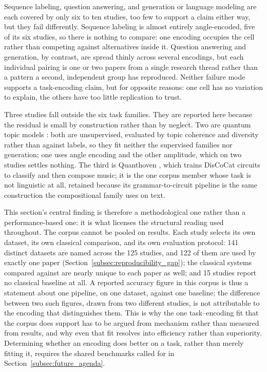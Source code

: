 \documentclass{ieeeaccess}
\begin{document}
Sequence labeling, question answering, and generation or language modeling are each covered by only six to ten studies, too few to support a claim either way, but they fail differently. Sequence labeling is almost entirely angle-encoded, five of its six studies, so there is nothing to compare: one encoding occupies the cell rather than competing against alternatives inside it. Question answering and generation, by contrast, are spread thinly across several encodings, but each individual pairing is one or two papers from a single research thread rather than a pattern a second, independent group has reproduced. Neither failure mode supports a task-encoding claim, but for opposite reasons: one cell has no variation to explain, the others have too little replication to trust.

Three studies fall outside the six task families. They are reported here because the residual is small by construction rather than by neglect. Two are quantum topic models \cite{kabir_qtopic_2026,qiao_quantum_2024}: both are unsupervised, evaluated by topic coherence and diversity rather than against labels, so they fit neither the supervised families nor generation; one uses angle encoding and the other amplitude, which on two studies settles nothing. The third is Quanthoven \cite{miranda_quantum_2022}, which trains DisCoCat circuits to classify and then compose music; it is the one corpus member whose task is not linguistic at all, retained because its grammar-to-circuit pipeline is the same construction the compositional family uses on text.

This section's central finding is therefore a methodological one rather than a performance-based one: it is what licenses the structural reading used throughout. The corpus cannot be pooled on results. Each study selects its own dataset, its own classical comparison, and its own evaluation protocol: 141 distinct datasets are named across the 125 studies, and 122 of them are used by exactly one paper (Section~\ref{subsec:reproducibility_gap}); the classical systems compared against are nearly unique to each paper as well; and 15 studies report no classical baseline at all. A reported accuracy figure in this corpus is thus a statement about one pipeline, on one dataset, against one baseline; the difference between two such figures, drawn from two different studies, is not attributable to the encoding that distinguishes them. This is why the one task--encoding fit that the corpus does support has to be argued from mechanism rather than measured from results, and why even that fit resolves into efficiency rather than superiority. Determining whether an encoding does better on a task, rather than merely fitting it, requires the shared benchmarks called for in Section~\ref{subsec:future_agenda}.
\end{document}

